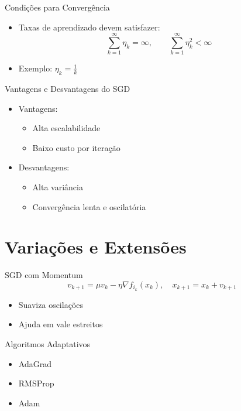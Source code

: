 \documentclass{beamer}
\begin{document}
\begin{frame}{Condi\c{c}\~oes para Converg\^encia}
\begin{itemize}
    \item Taxas de aprendizado devem satisfazer:
    \[
        \sum_{k=1}^\infty \eta_k = \infty, \qquad \sum_{k=1}^\infty \eta_k^2 < \infty
    \]
    \item Exemplo: \( \eta_k = \frac{1}{k} \)
\end{itemize}
\end{frame}

\begin{frame}{Vantagens e Desvantagens do SGD}
\begin{itemize}
    \item Vantagens:
    \begin{itemize}
        \item Alta escalabilidade
        \item Baixo custo por itera\c{c}\~ao
    \end{itemize}
    \item Desvantagens:
    \begin{itemize}
        \item Alta vari\^ancia
        \item Converg\^encia lenta e oscilat\'oria
    \end{itemize}
\end{itemize}
\end{frame}

\section{Varia\c{c}\~oes e Extens\~oes}

\begin{frame}{SGD com Momentum}
\[
    v_{k+1} = \mu v_k - \eta \nabla f_{i_k}(x_k), \quad x_{k+1} = x_k + v_{k+1}
\]
\begin{itemize}
    \item Suaviza oscila\c{c}\~oes
    \item Ajuda em vale estreitos
\end{itemize}
\end{frame}

\begin{frame}{Algoritmos Adaptativos}
\begin{itemize}
    \item AdaGrad
    \item RMSProp
    \item Adam
\end{itemize}
\end{frame}
\end{document}
